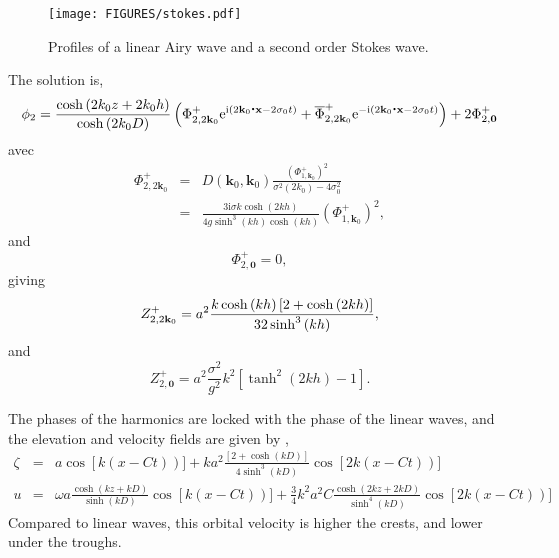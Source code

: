 \begin{figure}
\centerline{\texttt{[image: FIGURES/stokes.pdf]}}
\caption{Profiles of a linear Airy wave and a second order Stokes wave.} \label{stokes}
\end{figure}
The solution is, 
\begin{equation}
    \phi_2=\frac{\cosh\left(2 k_0 z+2 k_0 h\right)}{\cosh\left(2 k_0 D\right)}
    \left(
    \Phi_{2,2 {\mathbf k}_0}^{+}
    \mathrm{e}^{\mathrm{i}\left(2 \mathbf{k}_0\mbox{\boldmath $\cdot$}{\mathbf x}-2 \sigma_0 t\right)}
    +\overline{\Phi}_{2,2 {\mathbf k}_0}^{+}
    \mathrm{e}^{-\mathrm{i}\left(2 \mathbf{k}_0\mbox{\boldmath $\cdot$}{\mathbf x}-2 \sigma_0 t\right)}
      \right)
    +2 \Phi _{2,{\mathbf 0}}^{+}
\end{equation}
avec
\begin{eqnarray}
\Phi_{2,2 {\mathbf k}_0}^{+} & = &
    D\left({\mathbf k}_0,{\mathbf k}_0\right)
        \frac{\left(\Phi_{1,{\mathbf k}_0}^{+} \right)^2}
        {\sigma^2\left(2k_0\right)-4\sigma_0^2} \\
    & =& \frac{3{\mathrm i}\sigma k\cosh\left(2kh\right)}
        {4g\sinh^3\left(kh\right) \cosh\left(kh\right)  }
        \left(\Phi_{1,{\mathbf k}_0}^{+} \right)^2,
\end{eqnarray}
and
\begin{equation}
\Phi_{2,{\mathbf 0}}^{+}  = 0,
\end{equation}
giving
\begin{equation}
    Z_{2,2{\mathbf{k}}_0}^{+}
    = a^2 \frac{k\cosh\left(kh\right)\left[2+\cosh\left(2k h\right)\right]}
        {32 \sinh ^3 \left(kh\right)},
\end{equation}
and
\begin{equation}
    Z_{2,{\mathbf 0}}^{+}
    = a^2 \frac{\sigma^2}{g^2}k^2\left[\tanh^2\left(2kh\right)-1\right].
\end{equation}


The phases of the harmonics are locked with the phase of the linear waves, and the elevation and velocity 
fields are given by \citep{Dean&Dalrymple1991},
\begin{eqnarray}
    \zeta&=&a \cos \left[k\left(x- C t\right) \right)]
    + ka^2 \frac{\left[2+\cosh\left(kD\right)\right]}
        {4 \sinh^3\left(kD\right)} \cos \left[2k\left(x- C t\right) \right)]\\
    u&=&\omega a \frac{\cosh\left(kz+kD\right)}{\sinh\left(kD\right)}
        \cos \left[k\left(x- C t\right) \right)]
    + \frac{3}{4} k^2 a^2 C \frac{\cosh\left(2kz+2kD\right)}
        {\sinh^4\left(kD\right)}    \cos \left[2k\left(x- C t\right) \right)]
\end{eqnarray}
Compared to linear waves, this orbital velocity is higher the crests, and lower 
under the troughs. 




